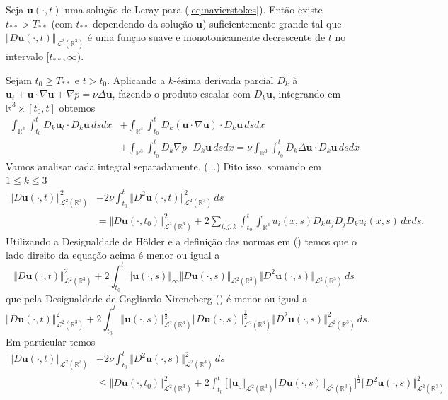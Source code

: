\documentclass[a4paper, 11pt]{book}
\theoremstyle{definition}
\newcommand{\bR}{\mathbb{R}}
\newcommand{\bu}{\mathbf{u}}
\newcommand{\cL}{\mathcal{L}}
\begin{document}
\begin{pbox}
    Seja $\bu(\cdot,t)$ uma solução de Leray para (\ref{eq:navierstokes}). Então existe $t_{**} > T_{**}$ (com $t_{**}$ dependendo da solução $\bu$) suficientemente grande tal que $\Vert D\bu(\cdot,t) \Vert_{\cL^2(\bR^3)}$ é uma funçao suave e monotonicamente decrescente de $t$ no intervalo $[t_{**}, \infty)$.
\end{pbox}
\begin{prf}
    Sejam $t_0 \geqslant T_{**}$ e $t > t_0$.
    Aplicando a $k$-ésima derivada parcial $D_k$ à $\bu_t + \bu \cdot \nabla \bu + \nabla p = \nu \Delta \bu$, fazendo o produto escalar com $D_k \bu$, integrando em $\bR^3 \times [t_0,t]$ obtemos
    \[
        \begin{aligned}
            \int_{\bR^3} \int_{t_0}^t D_k \bu_t \cdot D_k \bu \,dsdx &+ \int_{\bR^3} \int_{t_0}^t D_k (\bu \cdot \nabla \bu) \cdot D_k \bu \,dsdx\\ 
            &+ \int_{\bR^3} \int_{t_0}^t D_k \nabla p \cdot D_k\bu \,dsdx = \nu \int_{\bR^3} \int_{t_0}^t D_k \Delta \bu \cdot D_k \bu \,dsdx
        \end{aligned}
    \]
    Vamos analisar cada integral separadamente. (...)
    Dito isso, somando em $1 \leqslant k \leqslant 3$
    \[
        \begin{aligned}
            \Vert D\bu(\cdot,t) \Vert_{\cL^2(\bR^3)}^2 &+ 2\nu \int_{t_0}^t \Vert D^2 \bu(\cdot,t) \Vert_{\cL^2(\bR^3)}^2 \,ds\\ &= \Vert D\bu(\cdot,t_0) \Vert_{\cL^2(\bR^3)}^2 + 2 \sum_{i,j,k} \int_{t_0}^t \int_{\bR^3} u_i(x,s) D_k u_j D_j D_k u_i(x,s) \,dxds.
        \end{aligned}
    \]
    Utilizando a Desigualdade de Hölder e a definição das normas em () temos que o lado direito da equação acima é menor ou igual a
    \[
        \Vert D\bu(\cdot,t) \Vert_{\cL^2(\bR^3)}^2 + 2 \! \int_{t_0}^t \Vert \bu(\cdot,s) \Vert_{\infty} \Vert D\bu(\cdot,s) \Vert_{\cL^2(\bR^3)} \Vert D^2\bu(\cdot,s) \Vert_{\cL^2(\bR^3)} \,ds
    \]
    que pela Desigualdade de Gagliardo-Nireneberg () é menor ou igual a
    \[
        \Vert D\bu(\cdot,t) \Vert_{\cL^2(\bR^3)}^2 + 2 \! \int_{t_0}^t \Vert \bu(\cdot,s) \Vert_{\cL^2(\bR^3)}^{\frac{1}{2}} \Vert D\bu(\cdot,s) \Vert_{\cL^2(\bR^3)}^{\frac{1}{2}} \Vert D^2\bu(\cdot,s) \Vert_{\cL^2(\bR^3)}^2 \,ds.
    \]
    Em particular temos
    \[
        \begin{aligned}
            \Vert D\bu(\cdot,t) \Vert_{\cL^2(\bR^3)} &+ 2 \nu \int_{t_0}^t \Vert D^2 \bu(\cdot,s) \Vert_{\cL^2(\bR^3)}^2 \,ds\\ &\leqslant \Vert D\bu(\cdot,t_0) \Vert_{\cL^2(\bR^3)}^2 + 2 \! \int_{t_0}^t \big[ \Vert \bu_0 \Vert_{\cL^2(\bR^3)} \Vert D\bu(\cdot,s) \Vert_{\cL^2(\bR^3)} \big]^\frac{1}{2} \Vert D^2\bu(\cdot,s) \Vert_{\cL^2(\bR^3)}^2

\end{aligned}\]
\end{prf}
\end{document}
